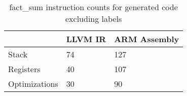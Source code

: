 \begin{table}[h!]
\centering
\begin{tabular}{p{}p{}p{}}
  \hline
 & LLVM IR & ARM Assembly \\ 
  \hline
Stack &  74 & 127 \\ 
  Registers &  40 & 107 \\ 
  Optimizations &  30 &  90 \\ 
   \hline
\end{tabular}
\caption{fact\_sum instruction counts for generated code excluding labels}
\end{table}

